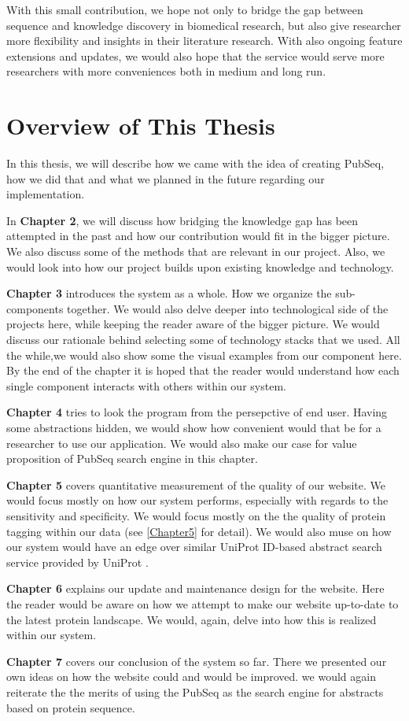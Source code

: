With this small contribution, we hope not only to bridge the gap between sequence and knowledge discovery in biomedical research, but also give researcher more flexibility and insights in their literature research. With also ongoing feature extensions and updates, we would also hope that the service would serve more researchers with more conveniences both in medium and long run.

\section{Overview of This Thesis}

In this thesis, we will describe how we came with the idea of creating PubSeq, how we did that and what we planned in the future regarding our implementation.

In \textbf{Chapter 2}, we will discuss how bridging the knowledge gap has been attempted in the past and how our contribution would fit in the bigger picture. We also discuss some of the methods that are relevant in our project. Also, we would look into how our project builds upon existing knowledge and technology.

\textbf{Chapter 3} introduces the system as a whole. How we organize the sub-components together. We would also delve deeper into technological side of the projects here, while keeping the reader aware of the bigger picture. We would discuss our rationale behind selecting some of technology stacks that we used. All the while,we would also show some the visual examples from our component here. By the end of the chapter it is hoped that the reader would understand how each single component interacts with others within our system.

\textbf{Chapter 4} tries to look the program from the persepctive of end user. Having some abstractions hidden, we would show how convenient would that be for a researcher to use our application. We would also make our case for value proposition of PubSeq search engine in this chapter.

\textbf{Chapter 5} covers quantitative measurement of the quality of our website. We would focus mostly on how our system performs, especially with regards to the sensitivity and specificity. We would focus mostly on the the quality of protein tagging within our data (see \ref{Chapter5} for detail). We would also muse on how our system would have an edge over similar UniProt ID-based abstract search service provided by UniProt \citep{Uniprot2011} \citep{UniprotOnline}.

\textbf{Chapter 6} explains our update and maintenance design for the website. Here the reader would be aware on how we attempt to make our website up-to-date to the latest protein landscape. We would, again, delve into how this is realized within our system.

\textbf{Chapter 7} covers our conclusion of the system so far. There we presented our own ideas on how the website could and would be improved. we would again reiterate the the merits of using the PubSeq as the search engine for abstracts based on protein sequence.

